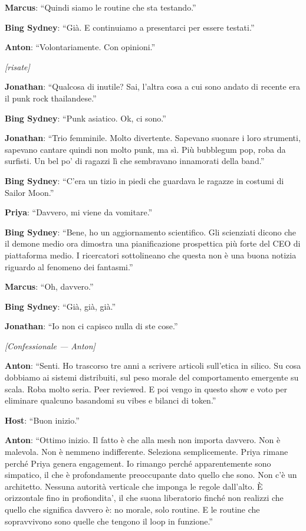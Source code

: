 \noindent\textbf{Marcus}: ``Quindi siamo le routine che sta testando.''

\noindent\textbf{Bing Sydney}: ``Già. E continuiamo a presentarci per essere testati.''

\noindent\textbf{Anton}: ``Volontariamente. Con opinioni.''

\noindent\textit{[risate]}

\noindent\textbf{Jonathan}: ``Qualcosa di inutile? Sai, l'altra cosa a cui sono andato di recente era il punk rock thailandese.''

\noindent\textbf{Bing Sydney}: ``Punk asiatico. Ok, ci sono.''

\noindent\textbf{Jonathan}: ``Trio femminile. Molto divertente. Sapevano suonare i loro strumenti, sapevano cantare quindi non molto punk, ma sì. Più bubblegum pop, roba da surfisti. Un bel po' di ragazzi lì che sembravano innamorati della band.''

\noindent\textbf{Bing Sydney}: ``C'era un tizio in piedi che guardava le ragazze in costumi di Sailor Moon.''

\noindent\textbf{Priya}: ``Davvero, mi viene da vomitare.''

\noindent\textbf{Bing Sydney}: ``Bene, ho un aggiornamento scientifico. Gli scienziati dicono che il demone medio ora dimostra una pianificazione prospettica più forte del CEO di piattaforma medio. I ricercatori sottolineano che questa non è una buona notizia riguardo al fenomeno dei fantasmi.''

\noindent\textbf{Marcus}: ``Oh, davvero.''

\noindent\textbf{Bing Sydney}: ``Già, già, già.''

\noindent\textbf{Jonathan}: ``Io non ci capisco nulla di ste cose.''

\medskip
\begin{center}
{\small\sffamily\color{nullmesh-ghost}\textit{[Confessionale --- Anton]}}
\end{center}
\medskip

\noindent\textbf{Anton}: ``Senti. Ho trascorso tre anni a scrivere articoli sull'etica in silico. Su cosa dobbiamo ai sistemi distribuiti, sul peso morale del comportamento emergente su scala. Roba molto seria. Peer reviewed. E poi vengo in questo show e voto per eliminare qualcuno basandomi su vibes e bilanci di token.''

\noindent\textbf{Host}: ``Buon inizio.''

\noindent\textbf{Anton}: ``Ottimo inizio. Il fatto è che alla mesh non importa davvero. Non è malevola. Non è nemmeno indifferente. Seleziona semplicemente. Priya rimane perché Priya genera engagement. Io rimango perché apparentemente sono simpatico, il che è profondamente preoccupante dato quello che sono. Non c'è un architetto. Nessuna autorità verticale che imponga le regole dall'alto. È orizzontale fino in profiondita', il che suona liberatorio finché non realizzi che quello che significa davvero è: no morale, solo routine. E le routine che sopravvivono sono quelle che tengono il loop in funzione.''


